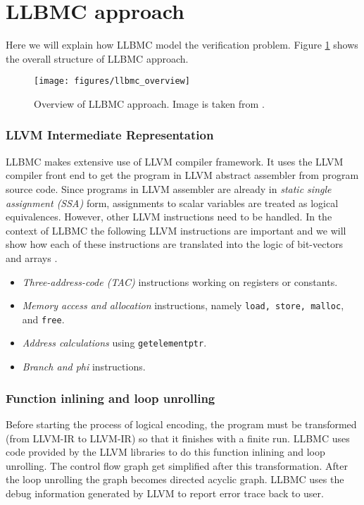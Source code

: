 \documentclass[14pt]{article}
\begin{document}
{\section{LLBMC approach}\label{llbmc approach}
Here we will explain how LLBMC model the verification problem. Figure \ref{fig:llbmc_overview} shows the overall structure of LLBMC approach. 
\begin{figure}[htb!]
  \begin{centering}
    \texttt{[image: figures/llbmc\_overview]}\par
  \end{centering}
  \caption{ Overview of LLBMC approach. Image is taken from \cite{llbmc2}.}
  \label{fig:llbmc_overview}
\end{figure}



\subsubsection*{LLVM Intermediate Representation}
LLBMC makes extensive use of LLVM compiler framework. It uses the LLVM compiler front end to get the program in LLVM abstract assembler from program source code. Since programs in LLVM assembler are already in \textit{static single assignment (SSA)} form, assignments to scalar variables are treated as logical equivalences. However, other LLVM instructions need to be handled. 
In the context of LLBMC the following LLVM instructions are important and we will show how each of these instructions are translated into the logic of bit-vectors and arrays \cite{bit vectors and arrays}. 
\begin{itemize}
  \item \textit{Three-address-code (TAC)} instructions working on registers or constants.
  \item \textit{Memory access and allocation} instructions, namely \texttt{load, store, malloc}, and \texttt{free}.
  \item \textit{Address calculations} using \texttt{getelementptr}.
  \item \textit{Branch and phi} instructions.
\end{itemize}

\subsubsection*{Function inlining and loop unrolling} 
Before starting the process of logical encoding, the program must be transformed (from LLVM-IR to LLVM-IR) so that it finishes with a finite run. LLBMC uses code provided by the LLVM libraries to do this function inlining and loop unrolling. The control flow graph get simplified after this transformation. After the loop unrolling the graph becomes directed acyclic graph. LLBMC uses the debug information generated by LLVM to report error trace back to user.

}
\end{document}
